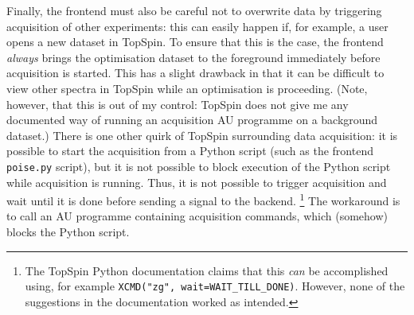 Finally, the frontend must also be careful not to overwrite data by triggering acquisition of other experiments: this can easily happen if, for example, a user opens a new dataset in TopSpin.
To ensure that this is the case, the frontend \textit{always} brings the optimisation dataset to the foreground immediately before acquisition is started.
This has a slight drawback in that it can be difficult to view other spectra in TopSpin while an optimisation is proceeding.
(Note, however, that this is out of my control: TopSpin does not give me any documented way of running an acquisition AU programme on a background dataset.)
There is one other quirk of TopSpin surrounding data acquisition: it is possible to start the acquisition from a Python script (such as the frontend \texttt{poise.py} script), but it is not possible to block execution of the Python script while acquisition is running.
Thus, it is not possible to trigger acquisition and wait until it is done before sending a signal to the backend.%
\footnote{The TopSpin Python documentation claims that this \textit{can} be accomplished using, for example \texttt{XCMD("zg", wait=WAIT\_TILL\_DONE)}. However, none of the suggestions in the documentation worked as intended.}
The workaround is to call an AU programme containing acquisition commands, which (somehow) blocks the Python script.
